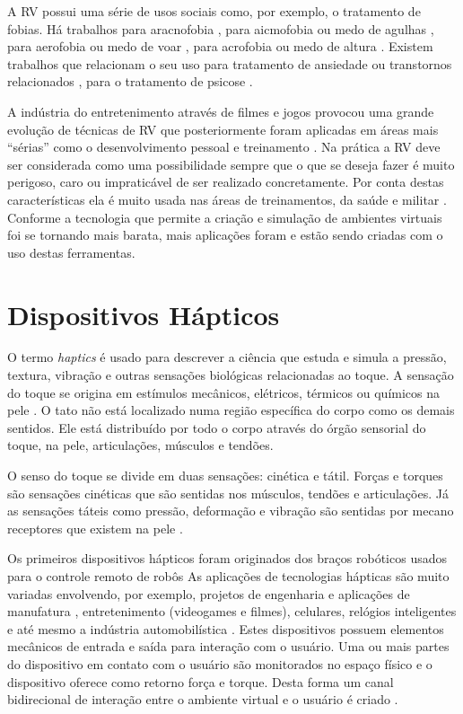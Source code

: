 A \acrshort{RV} possui uma série de usos sociais como, por exemplo, o tratamento de fobias. Há trabalhos para aracnofobia \cite{Zimmer2021}, para aicmofobia ou medo de agulhas \cite{McCarthy2021}, para aerofobia ou medo de voar \cite{Rothbaum2006}, para acrofobia ou medo de altura \cite{Rimer2021}. Existem trabalhos que relacionam o seu uso para tratamento de ansiedade ou transtornos relacionados \cite{Meyerbroker2021}, para o tratamento de psicose \cite{Freeman2022}. 

A indústria do entretenimento através de filmes e jogos provocou uma grande evolução de técnicas de \acrshort{RV} que posteriormente foram aplicadas em áreas mais “sérias” como o desenvolvimento pessoal e treinamento \cite{Soliman2021, Paszkiewicz2021, Lin2021, Vrillon2022}. Na prática a \acrshort{RV} deve ser considerada como uma possibilidade sempre que o que se deseja fazer é muito perigoso, caro ou impraticável de ser realizado concretamente. Por conta destas características ela é muito usada nas áreas de treinamentos, da saúde e militar \cite{VRS2018}. Conforme a tecnologia que permite a criação e simulação de ambientes virtuais foi se tornando mais barata, mais aplicações foram e estão sendo criadas com o uso destas ferramentas.

\section{Dispositivos Hápticos}

O termo \textit{haptics} é usado para descrever a ciência que estuda e simula a pressão, textura, vibração e outras sensações biológicas relacionadas ao toque. A sensação do toque se origina em estímulos mecânicos, elétricos, térmicos ou químicos na pele \cite{Burdea1996}. O tato não está localizado numa região específica do corpo como os demais sentidos. Ele está distribuído por todo o corpo através do órgão sensorial do toque, na pele, articulações, músculos e tendões. 

O senso do toque se divide em duas sensações: cinética e tátil. Forças e torques são sensações cinéticas que são sentidas nos músculos, tendões e articulações. Já as sensações táteis como pressão, deformação e vibração são sentidas por mecano receptores que existem na pele \cite{Culbertson2018}. 

Os primeiros dispositivos hápticos foram originados dos braços robóticos usados para o controle remoto de robôs \cite{Zurawski2005} As aplicações de tecnologias hápticas são muito variadas envolvendo, por exemplo, projetos de engenharia e aplicações de manufatura \cite{Sharma2001}, entretenimento (videogames e filmes), celulares, relógios inteligentes e até mesmo a indústria automobilística \cite{Smith2019}. Estes dispositivos possuem elementos mecânicos de entrada e saída para interação com o usuário. Uma ou mais partes do dispositivo em contato com o usuário são monitorados no espaço físico e o dispositivo oferece como retorno força e torque. Desta forma um canal bidirecional de interação entre o ambiente virtual e o usuário é criado \cite{Coles2011}. 

